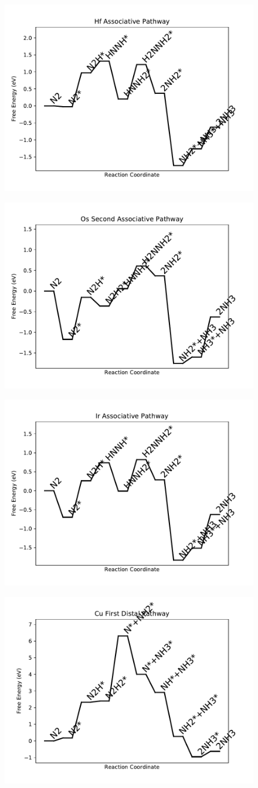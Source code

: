 \documentclass[journal=jacsat,manuscript=article]{achemso}
\begin{document}
\newpage
\begin{figure}
\includegraphics[width=0.5\linewidth]{data/plots/Hf_associative.pdf}
\label{fig:Hf_associative}
\end{figure}

\begin{figure}
\includegraphics[width=0.5\linewidth]{data/plots/Os_associative_2.pdf}
\label{fig:Os_associative_2}
\end{figure}

\newpage
\begin{figure}
\includegraphics[width=0.5\linewidth]{data/plots/Ir_associative.pdf}
\label{fig:Ir_associative}
\end{figure}

\begin{figure}
\includegraphics[width=0.5\linewidth]{data/plots/Cu_distal_1.pdf}
\label{fig:Cu_distal_1}
\end{figure}
\end{document}
